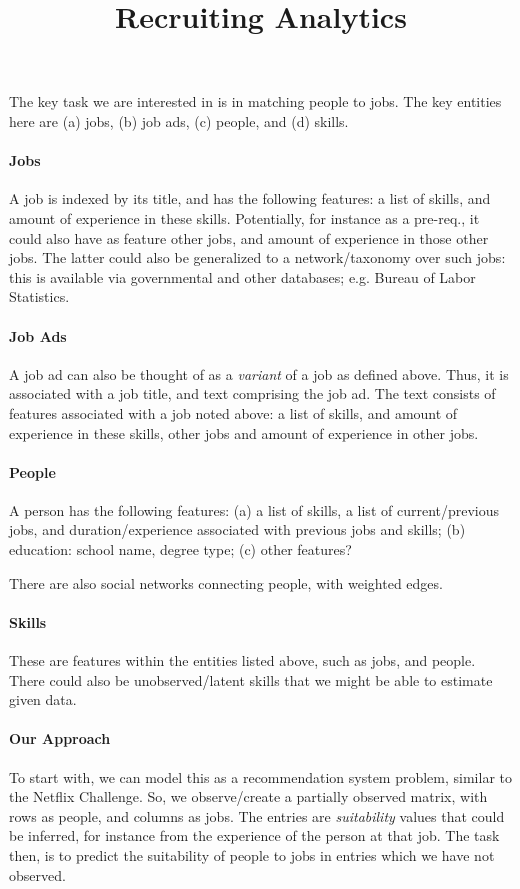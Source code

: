 \documentclass{article}
\title{Recruiting Analytics}
\date{}
\begin{document}
\maketitle

\noindent

The key task we are interested in is in matching people to jobs. The key entities here are (a) jobs, (b) job ads, (c) people, and (d) skills.

\paragraph{Jobs}
A job is indexed by its title, and has the following features: a list of skills, and amount of experience in these skills. Potentially, for instance as a pre-req., it could also have as feature other jobs, and amount of experience in those other jobs. The latter could also be generalized to a network/taxonomy over such jobs: this is available via governmental and other databases; e.g. Bureau of Labor Statistics. 

\paragraph{Job Ads}
A job ad can also be thought of as a \emph{variant} of a job as defined above. Thus, it is associated with a job title, and text comprising the job ad. The text consists of features associated with a job noted above:  a list of skills, and amount of experience in these skills, other jobs and amount of experience in other jobs. 

\paragraph{People}
A person has the following features:
(a) a list of skills, a list of current/previous jobs, and duration/experience associated with previous jobs and skills;
(b) education: school name, degree type;
(c) other features?

There are also social networks connecting people, with weighted edges.

\paragraph{Skills}

These are features within the entities listed above, such as jobs, and people. There could also be unobserved/latent skills that we might be able to estimate given data.

\paragraph{Our Approach}
To start with, we can model this as a recommendation system problem, similar to the Netflix Challenge. So, we observe/create a partially observed matrix, with rows as people, and columns as jobs. The entries are \emph{suitability} values that could be inferred, for instance from the experience of the person at that job. The task then, is to predict the suitability of people to jobs in entries which we have not observed.
\end{document}
